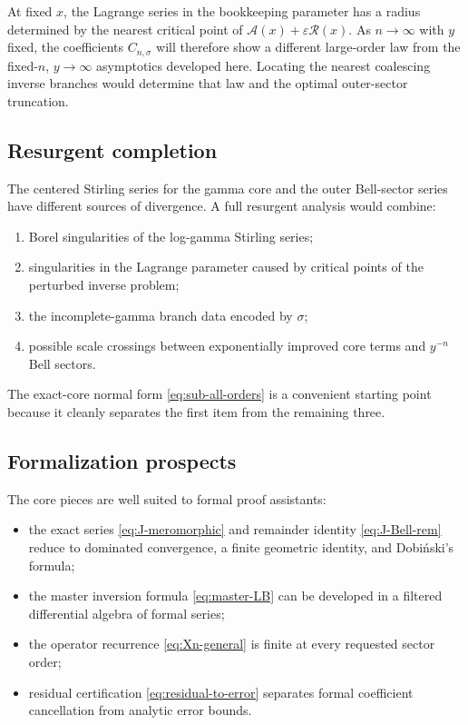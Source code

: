\documentclass[11pt,a4paper]{article}
\numberwithin{equation}{section}
\theoremstyle{definition}
\theoremstyle{remark}
\newcommand{\Core}{\mathcal A}
\newcommand{\Res}{\mathcal R}
\begin{document}
At fixed $x$, the Lagrange series in the bookkeeping parameter has a radius
determined by the nearest critical point of
$\Core(x)+\varepsilon\Res(x)$.  As $n\to\infty$ with $y$ fixed, the
coefficients $C_{n,\sigma}$ will therefore show a different large-order law
from the fixed-$n$, $y\to\infty$ asymptotics developed here.  Locating the
nearest coalescing inverse branches would determine that law and the optimal
outer-sector truncation.

\subsection{Resurgent completion}

The centered Stirling series for the gamma core and the outer Bell-sector
series have different sources of divergence.  A full resurgent analysis
would combine:

\begin{enumerate}
\item Borel singularities of the log-gamma Stirling series;
\item singularities in the Lagrange parameter caused by critical points of
      the perturbed inverse problem;
\item the incomplete-gamma branch data encoded by $\sigma$;
\item possible scale crossings between exponentially improved core terms and
      $y^{-n}$ Bell sectors.
\end{enumerate}

The exact-core normal form \eqref{eq:sub-all-orders} is a convenient starting
point because it cleanly separates the first item from the remaining three.

\subsection{Formalization prospects}

The core pieces are well suited to formal proof assistants:

\begin{itemize}
\item the exact series \eqref{eq:J-meromorphic} and remainder identity
      \eqref{eq:J-Bell-rem} reduce to dominated convergence, a finite
      geometric identity, and Dobi\'nski's formula;
\item the master inversion formula \eqref{eq:master-LB} can be developed in
      a filtered differential algebra of formal series;
\item the operator recurrence \eqref{eq:Xn-general} is finite at every
      requested sector order;
\item residual certification \eqref{eq:residual-to-error} separates formal
      coefficient cancellation from analytic error bounds.
\end{itemize}
\end{document}
